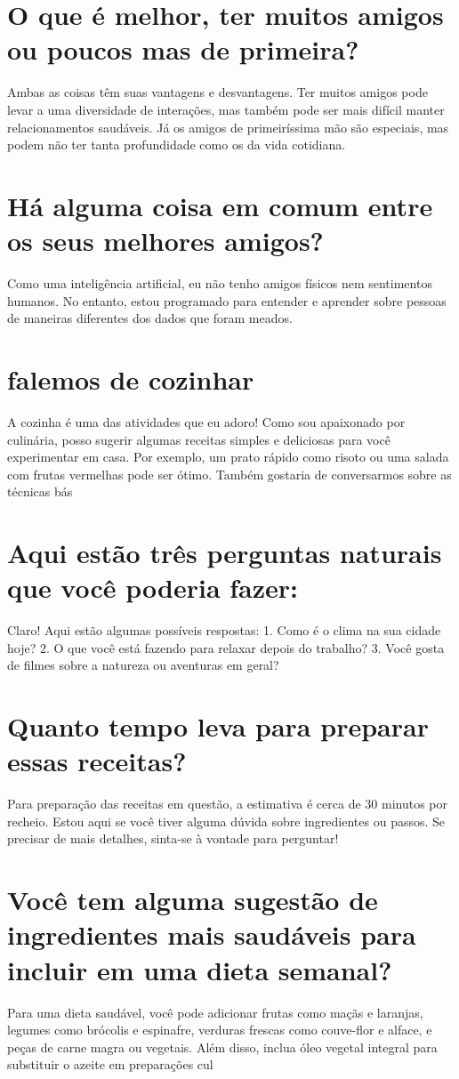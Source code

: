 \documentclass[11pt,a4paper]{article}
\begin{document}
\section{O que é melhor, ter muitos amigos ou poucos mas de primeira?}
Ambas as coisas têm suas vantagens e desvantagens. Ter muitos amigos pode levar a uma diversidade de interações, mas também pode ser mais difícil manter relacionamentos saudáveis. Já os amigos de primeiríssima mão são especiais, mas podem não ter tanta profundidade como os da vida cotidiana.

\section{Há alguma coisa em comum entre os seus melhores amigos?}
Como uma inteligência artificial, eu não tenho amigos físicos nem sentimentos humanos. No entanto, estou programado para entender e aprender sobre pessoas de maneiras diferentes dos dados que foram meados.

\section{falemos de cozinhar}
A cozinha é uma das atividades que eu adoro! Como sou apaixonado por culinária, posso sugerir algumas receitas simples e deliciosas para você experimentar em casa. Por exemplo, um prato rápido como risoto ou uma salada com frutas vermelhas pode ser ótimo. Também gostaria de conversarmos sobre as técnicas bás

\section{Aqui estão três perguntas naturais que você poderia fazer:}
Claro! Aqui estão algumas possíveis respostas: 1. Como é o clima na sua cidade hoje? 2. O que você está fazendo para relaxar depois do trabalho? 3. Você gosta de filmes sobre a natureza ou aventuras em geral?

\section{Quanto tempo leva para preparar essas receitas?}
Para preparação das receitas em questão, a estimativa é cerca de 30 minutos por recheio. Estou aqui se você tiver alguma dúvida sobre ingredientes ou passos. Se precisar de mais detalhes, sinta-se à vontade para perguntar!

\section{Você tem alguma sugestão de ingredientes mais saudáveis para incluir em uma dieta semanal?}
Para uma dieta saudável, você pode adicionar frutas como maçãs e laranjas, legumes como brócolis e espinafre, verduras frescas como couve-flor e alface, e peças de carne magra ou vegetais. Além disso, inclua óleo vegetal integral para substituir o azeite em preparações cul
\end{document}
